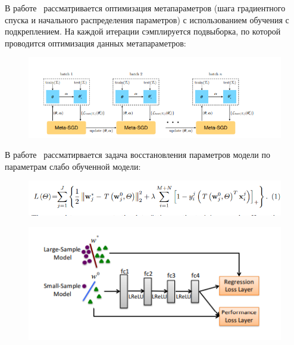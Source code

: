 В работе~\cite{meta_sgd} рассматривается оптимизация метапараметров (шага градиентного спуска и начального распределения параметров) с использованием обучения с подкреплением. На каждой итерации сэмплируется подвыборка, по которой проводится оптимизация данных метапараметров:
\begin{figure}[H]
\includegraphics[width=\textwidth]{./arch_review_figs/meta_sgd.png}
\end{figure}

В работе~\cite{l2l} рассматирвается задача восстановления параметров модели по параметрам слабо обученной модели:
\begin{figure}[H]
\includegraphics[width=\textwidth]{./arch_review_figs/l2l.png}
\end{figure}

\begin{figure}[H]
\includegraphics[width=\textwidth]{./arch_review_figs/l2l_scheme.png}
\end{figure}

